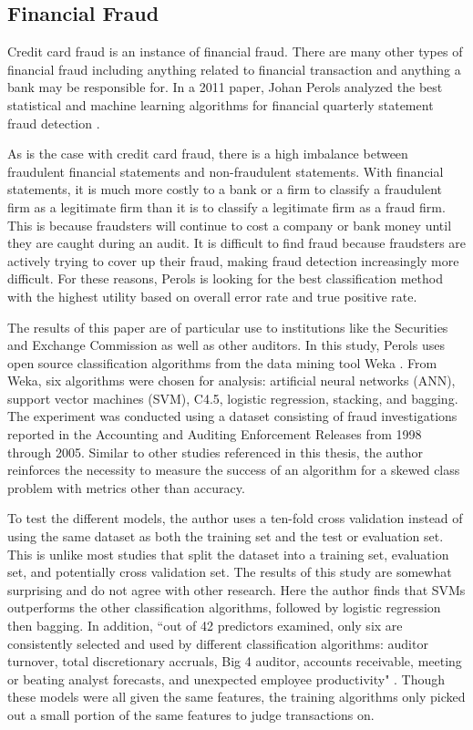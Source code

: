 \documentclass[midd]{thesis}
\begin{document}
\subsection{Financial Fraud}

Credit card fraud is an instance of financial fraud. There are many other types of financial fraud including anything related to financial transaction and anything a bank may be responsible for. In a 2011 paper, Johan Perols analyzed the best statistical and machine learning algorithms for financial quarterly statement fraud detection \cite{Perols2011}.  

As is the case with credit card fraud, there is a high imbalance between fraudulent financial statements and non-fraudulent statements. With financial statements, it is much more costly to a bank or a firm to classify a fraudulent firm as a legitimate firm than it is to classify a legitimate firm as a fraud firm. This is because fraudsters will continue to cost a company or bank money until they are caught during an audit. It is difficult to find fraud because fraudsters are actively trying to cover up their fraud, making fraud detection increasingly more difficult. For these reasons, Perols is looking for the best classification method with the highest utility based on overall error rate and true positive rate. 

The results of this paper are of particular use to institutions like the Securities and Exchange Commission as well as other auditors. In this study, Perols uses open source classification algorithms from the data mining tool Weka \cite{Perols2011}. From Weka, six algorithms were chosen for analysis: artificial neural networks (ANN), support vector machines (SVM), C4.5, logistic regression, stacking, and bagging. The experiment was conducted using a dataset consisting of fraud investigations reported in the Accounting and Auditing Enforcement Releases from 1998 through 2005. Similar to other studies referenced in this thesis, the author reinforces the necessity to measure the success of an algorithm for a skewed class problem with metrics other than accuracy. 

To test the different models, the author uses a ten-fold cross validation instead of using the same dataset as both the training set and the test or evaluation set. This is unlike most studies that split the dataset into a training set, evaluation set, and potentially cross validation set. The results of this study are somewhat surprising and do not agree with other research. Here the author finds that SVMs outperforms the other classification algorithms, followed by logistic regression then bagging. In addition, ``out of 42 predictors examined, only six are consistently selected and used by different classification algorithms: auditor turnover, total discretionary accruals, Big 4 auditor, accounts receivable, meeting or beating analyst forecasts, and unexpected employee productivity" \cite{Perols2011}. Though these models were all given the same features, the training algorithms only picked out a small portion of the same features to judge transactions on. 
\end{document}
